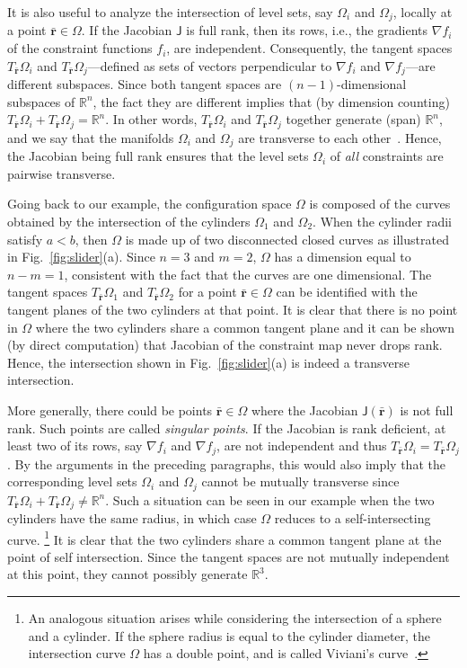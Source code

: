 It is also useful to analyze the intersection of level sets, say $\Omega_i$ and $\Omega_j$, locally at a point $\bar{\bm{r}} \in \Omega$.
If the Jacobian $\mathsf{J}$ is full rank, then its rows, i.e., the gradients $\nabla f_i$ of the constraint functions $f_i$, are independent.
Consequently, the tangent spaces $T_{\bar{\bm{r}}}{\Omega_i}$ and $T_{\bar{\bm{r}}}{\Omega_j}$---defined as sets of vectors perpendicular to $\nabla f_i$ and $\nabla f_j$---are different subspaces.
Since both tangent spaces are $(n-1)$-dimensional subspaces of $\mathbb{R}^n$, the fact they are different implies that (by dimension counting) $T_{\bar{\bm{r}}}{\Omega_i} + T_{\bar{\bm{r}}}{\Omega_j} = \mathbb{R}^n$.
In other words, $T_{\bar{\bm{r}}}{\Omega_i}$ and $T_{\bar{\bm{r}}}{\Omega_j}$ together generate (span) $\mathbb{R}^n$, and we say that the manifolds $\Omega_i$ and $\Omega_j$ are transverse to each other~\cite{guillemin1974}.
Hence, the Jacobian being full rank ensures that the level sets $\Omega_i$ of \emph{all} constraints are pairwise transverse.

Going back to our example, the configuration space $\Omega$ is composed of the curves obtained by the intersection of the cylinders $\Omega_1$ and $\Omega_2$.
When the cylinder radii satisfy $a < b$, then $\Omega$ is made up of two disconnected closed curves as illustrated in Fig.~\ref{fig:slider}(a).
Since $n = 3$ and $m=2$, $\Omega$ has a dimension equal to $n-m=1$, consistent with the fact that the curves are one dimensional.
The tangent spaces $T_{\bar{\bm{r}}}\Omega_1$ and $T_{\bar{\bm{r}}}\Omega_2$ for a point $\bar{\bm{r}} \in \Omega$ can be identified with the tangent planes of the two cylinders at that point.
It is clear that there is no point in $\Omega$ where the two cylinders share a common tangent plane and it can be shown (by direct computation) that Jacobian of the constraint map never drops rank.
Hence, the intersection shown in Fig.~\ref{fig:slider}(a) is indeed a transverse intersection.

More generally, there could be points $\bar{\bm{r}} \in \Omega$ where the Jacobian $\mathsf{J}(\bar{\bm{r}})$ is not full rank.
Such points are called \emph{singular points}.
If the Jacobian is rank deficient, at least two of its rows, say $\nabla f_i$ and $\nabla f_j$, are not independent and thus $T_{\bar{\bm{r}}}\Omega_i = T_{\bar{\bm{r}}}\Omega_j$.
By the arguments in the preceding paragraphs, this would also imply that the corresponding level sets $\Omega_i$ and $\Omega_j$ cannot be mutually transverse since $T_{\bar{\bm{r}}}\Omega_i + T_{\bar{\bm{r}}}\Omega_j \neq \mathbb{R}^n$.
Such a situation can be seen in our example when the two cylinders have the same radius, in which case $\Omega$ reduces to a self-intersecting curve.%
\footnote{An analogous situation arises while considering the intersection of a sphere and a cylinder.
If the sphere radius is equal to the cylinder diameter, the intersection curve $\Omega$ has a double point, and is called Viviani's curve~\cite{struik1988}.}
It is clear that the two cylinders share a common tangent plane at the point of self intersection.
Since the tangent spaces are not mutually independent at this point, they cannot possibly generate $\mathbb{R}^3$.

